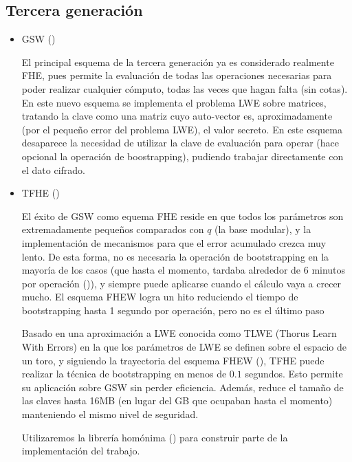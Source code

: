 \subsection{Tercera generación}

\begin{itemize}

  \item GSW (\cite{gentry_homomorphic_2013})

  El principal esquema de la tercera generación ya es considerado realmente FHE, pues permite la evaluación de todas las operaciones necesarias para poder realizar cualquier cómputo, todas las veces que hagan falta (sin cotas). En este nuevo esquema se implementa el problema LWE sobre matrices, tratando la clave como una matriz cuyo auto-vector es, aproximadamente (por el pequeño error del problema LWE), el valor secreto. En este esquema desaparece la necesidad de utilizar la clave de evaluación para operar (hace opcional la operación de boostrapping), pudiendo trabajar directamente con el dato cifrado.

  \item TFHE (\cite{cheon_faster_2016})

  El éxito de GSW como equema FHE reside en que todos los parámetros son extremadamente pequeños comparados con $q$ (la base modular), y la implementación de mecanismos para que el error acumulado crezca muy lento. De esta forma, no es necesaria la operación de bootstrapping en la mayoría de los casos (que hasta el momento, tardaba alrededor de 6 minutos por operación (\cite{ducas_fhew:_2014})), y siempre puede aplicarse cuando el cálculo vaya a crecer mucho. El esquema FHEW logra un hito reduciendo el tiempo de bootstrapping hasta 1 segundo por operación, pero no es el último paso

  Basado en una aproximación a LWE conocida como TLWE (Thorus Learn With Errors) en la que los parámetros de LWE se definen sobre el espacio de un toro, y siguiendo la trayectoria del esquema FHEW (\cite{ducas_fhew:_2014}), TFHE puede realizar la técnica de bootstrapping en menos de $0.1$ segundos. Esto permite su aplicación sobre GSW sin perder eficiencia. Además, reduce el tamaño de las claves hasta 16MB (en lugar del GB que ocupaban hasta el momento) manteniendo el mismo nivel de seguridad.

  Utilizaremos la librería homónima (\cite{chillotti_tfhe:_2016}) para construir parte de la implementación del trabajo.



\end{itemize}
